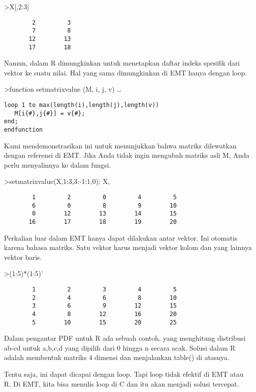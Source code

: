 \documentclass[
]{book}
\begin{document}
\textgreater X{[},2:3{]}

\begin{verbatim}
        2         3 
        7         8 
       12        13 
       17        18 
\end{verbatim}

Namun, dalam R dimungkinkan untuk menetapkan daftar indeks spesifik dari vektor ke suatu nilai. Hal yang sama dimungkinkan di EMT hanya dengan loop.

\textgreater function setmatrixvalue (M, i, j, v) \ldots{}

\begin{verbatim}
loop 1 to max(length(i),length(j),length(v))
   M[i{#},j{#}] = v{#};
end;
endfunction
\end{verbatim}

Kami mendemonstrasikan ini untuk menunjukkan bahwa matriks dilewatkan dengan referensi di EMT. Jika Anda tidak ingin mengubah matriks asli M, Anda perlu menyalinnya ke dalam fungsi.

\textgreater setmatrixvalue(X,1:3,3:-1:1,0); X,

\begin{verbatim}
        1         2         0         4         5 
        6         0         8         9        10 
        0        12        13        14        15 
       16        17        18        19        20 
\end{verbatim}

Perkalian luar dalam EMT hanya dapat dilakukan antar vektor. Ini otomatis karena bahasa matriks. Satu vektor harus menjadi vektor kolom dan yang lainnya vektor baris.

\textgreater(1:5)*(1:5)'

\begin{verbatim}
        1         2         3         4         5 
        2         4         6         8        10 
        3         6         9        12        15 
        4         8        12        16        20 
        5        10        15        20        25 
\end{verbatim}

Dalam pengantar PDF untuk R ada sebuah contoh, yang menghitung distribusi ab-cd untuk a,b,c,d yang dipilih dari 0 hingga n secara acak. Solusi dalam R adalah membentuk matriks 4 dimensi dan menjalankan table() di atasnya.

Tentu saja, ini dapat dicapai dengan loop. Tapi loop tidak efektif di EMT atau R. Di EMT, kita bisa menulis loop di C dan itu akan menjadi solusi tercepat.
\end{document}
